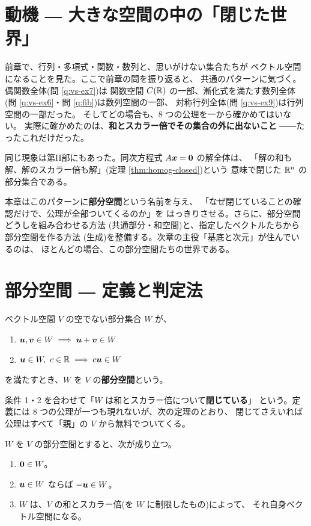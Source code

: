 \section{動機 ― 大きな空間の中の「閉じた世界」}

前章で、行列・多項式・関数・数列と、思いがけない集合たちが
ベクトル空間になることを見た。ここで前章の問を振り返ると、
共通のパターンに気づく。偶関数全体(問 \ref{q:vs-ex7})は
関数空間 $C(\mathbb{R})$ の一部、漸化式を満たす数列全体
(問 \ref{q:vs-ex6}・問 \ref{q:fib})は数列空間の一部、
対称行列全体(問 \ref{q:vs-ex9})は行列空間の一部だった。
そしてどの場合も、$8$ つの公理を一から確かめてはいない。
実際に確かめたのは、\textbf{和とスカラー倍でその集合の外に出ないこと}
――たったこれだけだった。

同じ現象は第II部にもあった。同次方程式 $A\bm{x} = \bm{0}$ の解全体は、
「解の和も解、解のスカラー倍も解」(定理 \ref{thm:homog-closed})という
意味で閉じた $\mathbb{R}^n$ の部分集合である。

本章はこのパターンに\textbf{部分空間}という名前を与え、
「なぜ閉じていることの確認だけで、公理が全部ついてくるのか」を
はっきりさせる。さらに、部分空間どうしを組み合わせる方法
(共通部分・和空間)と、指定したベクトルたちから部分空間を作る方法
(生成)を整備する。次章の主役「基底と次元」が住んでいるのは、
ほとんどの場合、この部分空間たちの世界である。

\section{部分空間 ― 定義と判定法}

\begin{teigi}[部分空間]
ベクトル空間 $V$ の空でない部分集合 $W$ が、
\begin{enumerate}
\item $\bm{u}, \bm{v} \in W \implies \bm{u} + \bm{v} \in W$
\item $\bm{u} \in W,\ c \in \mathbb{R} \implies c\bm{u} \in W$
\end{enumerate}
を満たすとき、$W$ を $V$ の\textbf{部分空間}という。
\end{teigi}

条件 1・2 を合わせて「$W$ は和とスカラー倍について\textbf{閉じている}」
という。定義には $8$ つの公理が一つも現れないが、次の定理のとおり、
閉じてさえいれば公理はすべて「親」の $V$ から無料でついてくる。

\begin{teiri}[部分空間はそれ自身ベクトル空間である]\label{thm:sub-inherit}
$W$ を $V$ の部分空間とすると、次が成り立つ。
\begin{enumerate}
\item $\bm{0} \in W$。
\item $\bm{u} \in W$ ならば $-\bm{u} \in W$。
\item $W$ は、$V$ の和とスカラー倍(を $W$ に制限したもの)によって、
それ自身ベクトル空間になる。
\end{enumerate}
\end{teiri}

